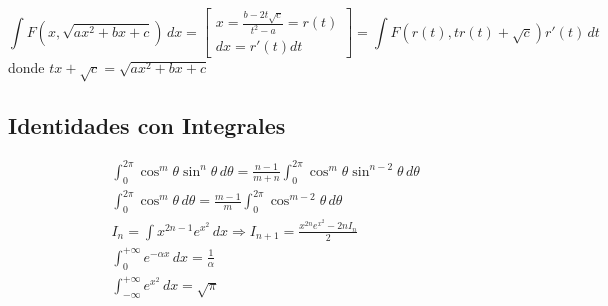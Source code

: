 \begin{equation}
\int F(x,\sqrt{ax^2+bx+c})\,dx =
\begin{bmatrix}
x = \frac{b-2t\sqrt{c}}{t^2-a} = r(t)\\
dx = r'(t)dt
\end{bmatrix} =
\int F(r(t),tr(t)+\sqrt{c})r'(t)\,dt
\nonumber
\end{equation}
\bigbreak
donde $tx+\sqrt{c} = \sqrt{ax^2+bx+c}$

\subsection{Identidades con Integrales}

\begin{minipage}{0.5\textwidth}
\begin{equation}
\begin{split}
    &\int^{2\pi}_0\cos^m\theta\sin^n\theta\,d\theta=
    \frac{n-1}{m+n}\int^{2\pi}_0\cos^m\theta
    \sin^{n-2}\theta\,d\theta\\
    &\int^{2\pi}_0\cos^m\theta\,d\theta=\frac{m-1}{m}
    \int^{2\pi}_0\cos^{m-2}\theta\,d\theta\\
    &I_n=\int x^{2n-1}e^{x^2}\,dx\Rightarrow I_{n+1}=
    \frac{x^{2n}e^{x^2}-2nI_n}{2}\\
    &\int^{+\infty}_0 e^{-\alpha x}\,dx=\frac{1}{\alpha}\\
    &\int^{+\infty}_{-\infty}e^{x^2}\,dx=\sqrt{\pi}\\
\end{split}
\nonumber
\end{equation}
\end{minipage}

\newpage
